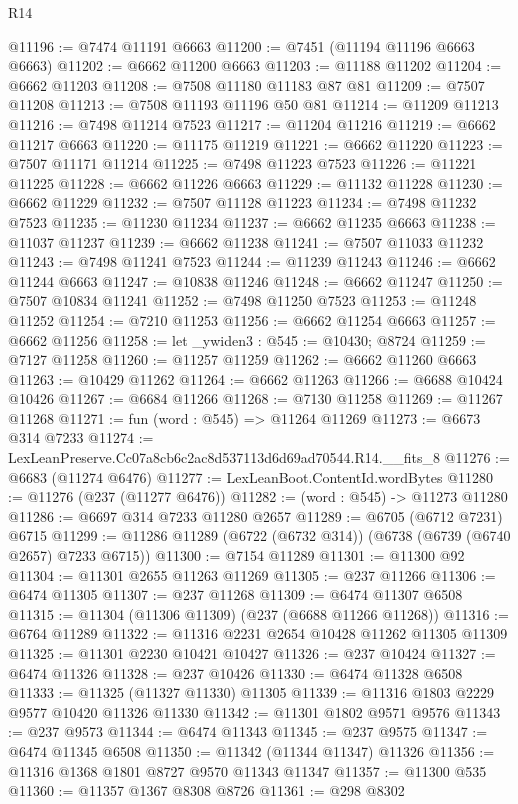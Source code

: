 \begin{lexlean}{R14}
\begin{coremodule}
@11196 := @7474 @11191 @6663
@11200 := @7451 (@11194 @11196 @6663 @6663)
@11202 := @6662 @11200 @6663
@11203 := @11188 @11202
@11204 := @6662 @11203
@11208 := @7508 @11180 @11183 @87 @81
@11209 := @7507 @11208
@11213 := @7508 @11193 @11196 @50 @81
@11214 := @11209 @11213
@11216 := @7498 @11214 @7523
@11217 := @11204 @11216
@11219 := @6662 @11217 @6663
@11220 := @11175 @11219
@11221 := @6662 @11220
@11223 := @7507 @11171 @11214
@11225 := @7498 @11223 @7523
@11226 := @11221 @11225
@11228 := @6662 @11226 @6663
@11229 := @11132 @11228
@11230 := @6662 @11229
@11232 := @7507 @11128 @11223
@11234 := @7498 @11232 @7523
@11235 := @11230 @11234
@11237 := @6662 @11235 @6663
@11238 := @11037 @11237
@11239 := @6662 @11238
@11241 := @7507 @11033 @11232
@11243 := @7498 @11241 @7523
@11244 := @11239 @11243
@11246 := @6662 @11244 @6663
@11247 := @10838 @11246
@11248 := @6662 @11247
@11250 := @7507 @10834 @11241
@11252 := @7498 @11250 @7523
@11253 := @11248 @11252
@11254 := @7210 @11253
@11256 := @6662 @11254 @6663
@11257 := @6662 @11256
@11258 := let _ywiden3 : @545 := @10430; @8724
@11259 := @7127 @11258
@11260 := @11257 @11259
@11262 := @6662 @11260 @6663
@11263 := @10429 @11262
@11264 := @6662 @11263
@11266 := @6688 @10424 @10426
@11267 := @6684 @11266
@11268 := @7130 @11258
@11269 := @11267 @11268
@11271 := fun (word : @545) => @11264 @11269
@11273 := @6673 @314 @7233
@11274 := LexLeanPreserve.Cc07a8cb6c2ac8d537113d6d69ad70544.R14.__fits_8
@11276 := @6683 (@11274 @6476)
@11277 := LexLeanBoot.ContentId.wordBytes
@11280 := @11276 (@237 (@11277 @6476))
@11282 := (word : @545) -> @11273 @11280
@11286 := @6697 @314 @7233 @11280 @2657
@11289 := @6705 (@6712 @7231) @6715
@11299 := @11286 @11289 (@6722 (@6732 @314)) (@6738 (@6739 (@6740 @2657) @7233 @6715))
@11300 := @7154 @11289
@11301 := @11300 @92
@11304 := @11301 @2655 @11263 @11269
@11305 := @237 @11266
@11306 := @6474 @11305
@11307 := @237 @11268
@11309 := @6474 @11307 @6508
@11315 := @11304 (@11306 @11309) (@237 (@6688 @11266 @11268))
@11316 := @6764 @11289
@11322 := @11316 @2231 @2654 @10428 @11262 @11305 @11309
@11325 := @11301 @2230 @10421 @10427
@11326 := @237 @10424
@11327 := @6474 @11326
@11328 := @237 @10426
@11330 := @6474 @11328 @6508
@11333 := @11325 (@11327 @11330) @11305
@11339 := @11316 @1803 @2229 @9577 @10420 @11326 @11330
@11342 := @11301 @1802 @9571 @9576
@11343 := @237 @9573
@11344 := @6474 @11343
@11345 := @237 @9575
@11347 := @6474 @11345 @6508
@11350 := @11342 (@11344 @11347) @11326
@11356 := @11316 @1368 @1801 @8727 @9570 @11343 @11347
@11357 := @11300 @535
@11360 := @11357 @1367 @8308 @8726
@11361 := @298 @8302

\end{coremodule}
\end{lexlean}
